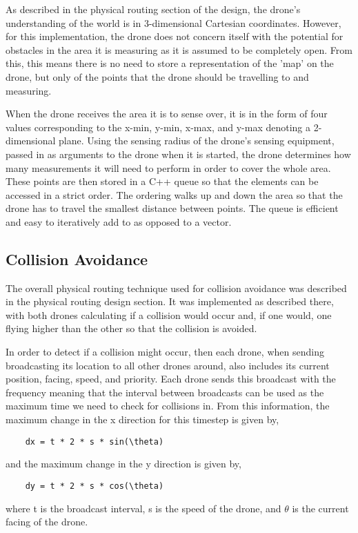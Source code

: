 As described in the physical routing section of the design, the drone's understanding of the world is in 3-dimensional Cartesian coordinates. However, for this implementation, the drone does not concern itself with the potential for obstacles in the area it is measuring as it is assumed to be completely open. From this, this means there is no need to store a representation of the 'map' on the drone, but only of the points that the drone should be travelling to and measuring.

When the drone receives the area it is to sense over, it is in the form of four values corresponding to the x-min, y-min, x-max, and y-max denoting a 2-dimensional plane. Using the sensing radius of the drone's sensing equipment, passed in as arguments to the drone when it is started, the drone determines how many measurements it will need to perform in order to cover the whole area. These points are then stored in a C++ queue so that the elements can be accessed in a strict order. The ordering walks up and down the area so that the drone has to travel the smallest distance between points. The queue is efficient and easy to iteratively add to as opposed to a vector.

\subsection{Collision Avoidance}
\label{sec:physicalrouting_collsionavoidance}

The overall physical routing technique used for collision avoidance was described in the physical routing design section. It was implemented as described there, with both drones calculating if a collision would occur and, if one would, one flying higher than the other so that the collision is avoided.

In order to detect if a collision might occur, then each drone, when sending broadcasting its location to all other drones around, also includes its current position, facing, speed, and priority. Each drone sends this broadcast with the frequency meaning that the interval between broadcasts can be used as the maximum time we need to check for collisions in. From this information, the maximum change in the x direction for this timestep is given by,
\begin{verbatim}
	dx = t * 2 * s * sin(\theta)
\end{verbatim}
and the maximum change in the y direction is given by,
\begin{verbatim}
	dy = t * 2 * s * cos(\theta)
\end{verbatim}
where t is the broadcast interval, s is the speed of the drone, and $\theta$ is the current facing of the drone.

